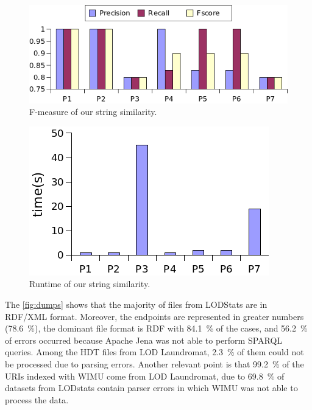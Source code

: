 \documentclass[sw]{iosart2x}
\begin{document}
\begin{figure}[htb] 
	\centering
	\includegraphics[width=\linewidth]{img/fmeasure.png}
	\caption{F-measure of our string similarity.}
	\label{fig:fmeasure}
\end{figure}

\begin{figure}[htb] 
	\centering
	\includegraphics[width=\linewidth]{img/runtime.png}
	\caption{Runtime of our string similarity.}
	\label{fig:runtimeSimilarMatch}
\end{figure}

The \cref{fig:dumps} shows that the majority of files from LODStats are in RDF/XML format.
Moreover, the endpoints are represented in greater numbers (\SI{78.6}{\percent}), the dominant file format is RDF with \SI{84.1}{\percent} of the cases, and \SI{56.2}{\percent} of errors occurred because Apache Jena was not able to perform SPARQL queries.
Among the HDT files from LOD Laundromat, \SI{2.3}{\percent} of them could not be processed due to parsing errors.
Another relevant point is that \SI{99.2}{\percent} of the URIs indexed with WIMU come from LOD Laundromat, due to \SI{69.8}{\percent} of datasets from LODstats contain parser errors in which WIMU was not able to process the data.
\end{document}
